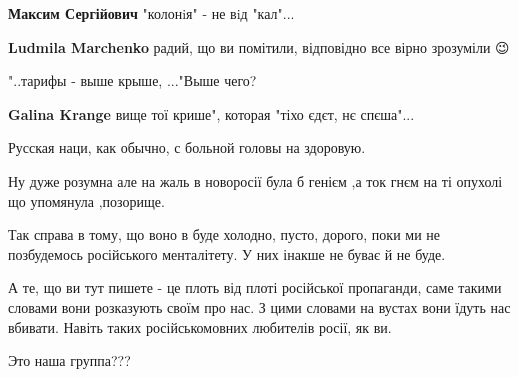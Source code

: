 \begin{itemize}
\begin{itemize}
\textbf{Максим Сергійович} "колонiя" - не вiд "кал"...


\textbf{Ludmila Marchenko} радий, що ви помітили, відповідно все вірно зрозуміли 😉
\end{itemize}


"..тарифы - выше крыше, ..."\Laughey[1.0][white] Выше чего?

\begin{itemize}

\textbf{Galina Krange} вище тої крише", которая "тіхо єдєт, нє спєша"...
\end{itemize}


Русская наци, как обычно, с больной головы на здоровую.


Ну дуже розумна але на жаль в новоросії була б генієм ,а ток гнєм на ті опухолі що упомянула ,позорище.



Так справа в тому, що воно в буде холодно, пусто, дорого, поки ми не
позбудемось російського менталітету. У них інакше не буває й не буде.

А те, що ви тут пишете - це плоть від плоті російської пропаганди, саме такими
словами вони розказують своїм про нас. З цими словами на вустах вони їдуть нас
вбивати. Навіть таких російськомовних любителів росії, як ви.


Это наша группа???

\begin{itemize}


\end{itemize}
\end{itemize}
